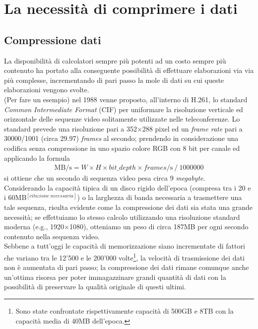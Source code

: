 
\chapter{La necessità di comprimere i dati} %

\label{Chapter3}



\section{Compressione dati}
La disponibilità di calcolatori sempre più potenti ad un costo sempre più
contenuto ha portato alla conseguente possibilità di effettuare elaborazioni
via via più complesse, incrementando di pari passo la mole di dati su cui
queste elaborazioni vengono svolte. \\
(Per fare un esempio) nel 1988 venne proposto, all'interno di H.261, lo standard
\emph{Common Intermediate Format} (CIF) per uniformare la risoluzione verticale
ed orizzontale delle sequenze video solitamente utilizzate nelle teleconferenze.
Lo standard prevede una risoluzione pari a 352${\times}$288 pixel ed un
\emph{frame rate} pari a 30000/1001 (circa 29.97) \emph{frames} al secondo;
prendendo in considerazione una codifica senza compressione in uno spazio
colore RGB con 8 bit per canale ed applicando la formula
\begin{align*}
  \text{MB}\!/\!\text{s} = 
  W \times H \times bit\_depth \times frames\!/\!\text{s} \:/\: 1000000
\end{align*}
si ottiene che un secondo di sequenza video pesa circa 9 \emph{megabyte}. \\
Considerando la capacità tipica di un disco rigido dell'epoca (compresa
tra i 20 e i 60MB$^{[citazione\: necessaria]}$) o la larghezza di banda 
necessaria a trasmettere una tale sequenza, risulta evidente come la 
compressione dei dati sia stata una grande necessità; se effettuiamo lo stesso 
calcolo utilizzando una risoluzione standard moderna (e.g., 1920$\times$1080), 
otteniamo un peso di circa 187MB per ogni secondo contenuto nella sequenza 
video. \\
Sebbene a tutt'oggi le capacità di memorizzazione siano incrementate di fattori
che variano tra le 12'500 e le 200'000 volte\footnote{Sono state confrontate
rispettivamente capacità di 500GB e 8TB con la capacità media di 40MB 
dell'epoca.}, la velocità di trasmissione dei dati non è aumentata di pari 
passo; la compressione dei dati rimane comunque anche un'ottima risorsa per
poter immagazzinare grandi quantità di dati con la possibilità di preservare
la qualità originale di questi ultimi.
